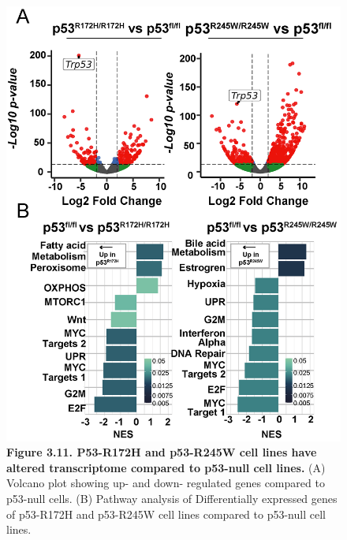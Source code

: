 \begin{figure}
\hypertarget{fig:3.11}{%
\centering
\includegraphics[width=1\textwidth,height=\textheight]{images/p539.png}
\caption{\textbf{Figure 3.11. P53-R172H and p53-R245W cell lines have altered transcriptome compared to p53-null cell lines.} (A) Volcano plot showing up- and down- regulated genes compared to p53-null cells. (B) Pathway analysis of Differentially expressed genes of p53-R172H and p53-R245W cell lines compared to p53-null cell lines.}\label{fig:3.11}
}
\end{figure}

